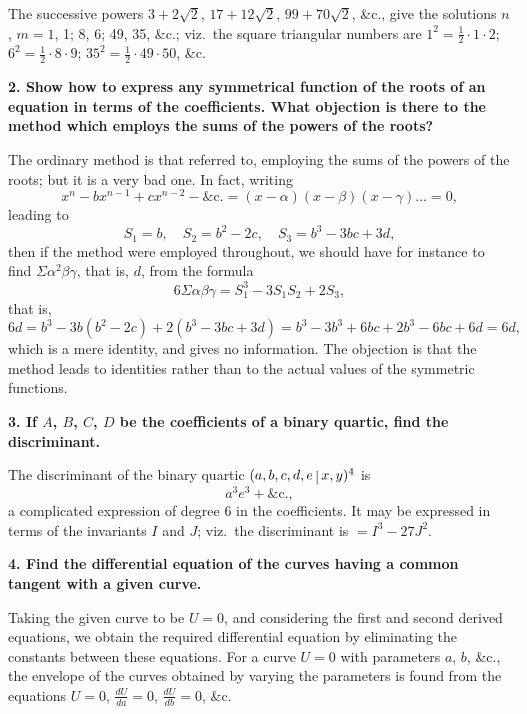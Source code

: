 \documentclass[11pt,a4paper]{book}
\begin{document}
The successive powers $3 + 2\surd 2$, $17 + 12\surd 2$, $99 + 70\surd 2$, \&c., give the solutions $n$, $m = 1$, 1; 8, 6; 49, 35, \&c.; viz.\ the square triangular numbers are $1^2 = \tfrac{1}{2} \cdot 1 \cdot 2$; $6^2 = \tfrac{1}{2} \cdot 8 \cdot 9$; $35^2 = \tfrac{1}{2} \cdot 49 \cdot 50$, \&c.

\smallskip

\noindent\textbf{2. Show how to express any symmetrical function of the roots of an equation in terms of the coefficients. What objection is there to the method which employs the sums of the powers of the roots?}

The ordinary method is that referred to, employing the sums of the powers of the roots; but it is a very bad one. In fact, writing
\[
x^n - bx^{n-1} + cx^{n-2} - \&\mathrm{c}. = (x - \alpha)(x - \beta)(x - \gamma) \ldots = 0,
\]
leading to
\[
S_1 = b,\quad S_2 = b^2 - 2c,\quad S_3 = b^3 - 3bc + 3d,
\]
then if the method were employed throughout, we should have for instance to find $\Sigma\alpha^2\beta\gamma$, that is, $d$, from the formula
\[
6\Sigma\alpha\beta\gamma = S_1^3 - 3S_1S_2 + 2S_3,
\]
that is,
\[
6d = b^3 - 3b(b^2 - 2c) + 2(b^3 - 3bc + 3d) = b^3 - 3b^3 + 6bc + 2b^3 - 6bc + 6d = 6d,
\]
which is a mere identity, and gives no information. The objection is that the method leads to identities rather than to the actual values of the symmetric functions.

\smallskip

\noindent\textbf{3. If $A$, $B$, $C$, $D$ be the coefficients of a binary quartic, find the discriminant.}

The discriminant of the binary quartic $(a, b, c, d, e \,\raisebox{-0.3ex}{$\vert$}\, x, y)^4$ is
\[
a^3 e^3 + \&\mathrm{c}.,
\]
a complicated expression of degree 6 in the coefficients. It may be expressed in terms of the invariants $I$ and $J$; viz.\ the discriminant is $= I^3 - 27J^2$.

\smallskip

\noindent\textbf{4. Find the differential equation of the curves having a common tangent with a given curve.}

Taking the given curve to be $U = 0$, and considering the first and second derived equations, we obtain the required differential equation by eliminating the constants between these equations. For a curve $U = 0$ with parameters $a$, $b$, \&c., the envelope of the curves obtained by varying the parameters is found from the equations $U = 0$, $\frac{dU}{da} = 0$, $\frac{dU}{db} = 0$, \&c.
\end{document}
